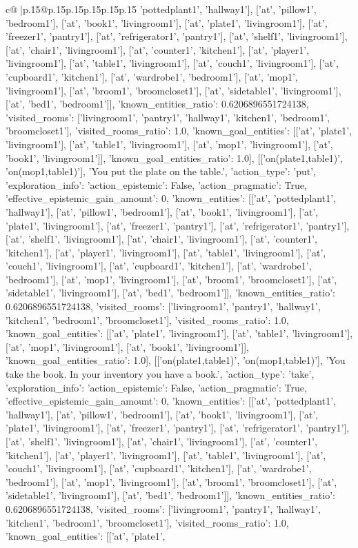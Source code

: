 \documentclass{article}
\begin{document}
{\begin{supertabular}{c@{$\;$}|p{.15\linewidth}@{}p{.15\linewidth}p{.15\linewidth}p{.15\linewidth}p{.15\linewidth}p{.15\linewidth}}
{{{'pottedplant1', 'hallway1'], ['at', 'pillow1', 'bedroom1'], ['at', 'book1', 'livingroom1'], ['at', 'plate1', 'livingroom1'], ['at', 'freezer1', 'pantry1'], ['at', 'refrigerator1', 'pantry1'], ['at', 'shelf1', 'livingroom1'], ['at', 'chair1', 'livingroom1'], ['at', 'counter1', 'kitchen1'], ['at', 'player1', 'livingroom1'], ['at', 'table1', 'livingroom1'], ['at', 'couch1', 'livingroom1'], ['at', 'cupboard1', 'kitchen1'], ['at', 'wardrobe1', 'bedroom1'], ['at', 'mop1', 'livingroom1'], ['at', 'broom1', 'broomcloset1'], ['at', 'sidetable1', 'livingroom1'], ['at', 'bed1', 'bedroom1']], 'known_entities_ratio': 0.6206896551724138, 'visited_rooms': ['livingroom1', 'pantry1', 'hallway1', 'kitchen1', 'bedroom1', 'broomcloset1'], 'visited_rooms_ratio': 1.0, 'known_goal_entities': [['at', 'plate1', 'livingroom1'], ['at', 'table1', 'livingroom1'], ['at', 'mop1', 'livingroom1'], ['at', 'book1', 'livingroom1']], 'known_goal_entities_ratio': 1.0}}], [['on(plate1,table1)', 'on(mop1,table1)'], 'You put the plate on the table.', {'action_type': 'put', 'exploration_info': {'action_epistemic': False, 'action_pragmatic': True, 'effective_epistemic_gain_amount': 0, 'known_entities': [['at', 'pottedplant1', 'hallway1'], ['at', 'pillow1', 'bedroom1'], ['at', 'book1', 'livingroom1'], ['at', 'plate1', 'livingroom1'], ['at', 'freezer1', 'pantry1'], ['at', 'refrigerator1', 'pantry1'], ['at', 'shelf1', 'livingroom1'], ['at', 'chair1', 'livingroom1'], ['at', 'counter1', 'kitchen1'], ['at', 'player1', 'livingroom1'], ['at', 'table1', 'livingroom1'], ['at', 'couch1', 'livingroom1'], ['at', 'cupboard1', 'kitchen1'], ['at', 'wardrobe1', 'bedroom1'], ['at', 'mop1', 'livingroom1'], ['at', 'broom1', 'broomcloset1'], ['at', 'sidetable1', 'livingroom1'], ['at', 'bed1', 'bedroom1']], 'known_entities_ratio': 0.6206896551724138, 'visited_rooms': ['livingroom1', 'pantry1', 'hallway1', 'kitchen1', 'bedroom1', 'broomcloset1'], 'visited_rooms_ratio': 1.0, 'known_goal_entities': [['at', 'plate1', 'livingroom1'], ['at', 'table1', 'livingroom1'], ['at', 'mop1', 'livingroom1'], ['at', 'book1', 'livingroom1']], 'known_goal_entities_ratio': 1.0}}], [['on(plate1,table1)', 'on(mop1,table1)'], 'You take the book. In your inventory you have a book.', {'action_type': 'take', 'exploration_info': {'action_epistemic': False, 'action_pragmatic': True, 'effective_epistemic_gain_amount': 0, 'known_entities': [['at', 'pottedplant1', 'hallway1'], ['at', 'pillow1', 'bedroom1'], ['at', 'book1', 'livingroom1'], ['at', 'plate1', 'livingroom1'], ['at', 'freezer1', 'pantry1'], ['at', 'refrigerator1', 'pantry1'], ['at', 'shelf1', 'livingroom1'], ['at', 'chair1', 'livingroom1'], ['at', 'counter1', 'kitchen1'], ['at', 'player1', 'livingroom1'], ['at', 'table1', 'livingroom1'], ['at', 'couch1', 'livingroom1'], ['at', 'cupboard1', 'kitchen1'], ['at', 'wardrobe1', 'bedroom1'], ['at', 'mop1', 'livingroom1'], ['at', 'broom1', 'broomcloset1'], ['at', 'sidetable1', 'livingroom1'], ['at', 'bed1', 'bedroom1']], 'known_entities_ratio': 0.6206896551724138, 'visited_rooms': ['livingroom1', 'pantry1', 'hallway1', 'kitchen1', 'bedroom1', 'broomcloset1'], 'visited_rooms_ratio': 1.0, 'known_goal_entities': [['at', 'plate1', }}}
\end{supertabular}}
\end{document}

